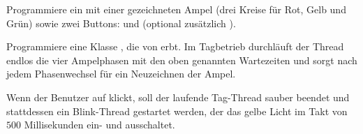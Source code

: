 \begin{compactenum}[a)]
\item Programmiere ein  mit einer gezeichneten Ampel (drei
Kreise für Rot, Gelb und Grün) sowie zwei Buttons:  und
 (optional zusätzlich ).

\item Programmiere eine Klasse , die von 
erbt. Im Tagbetrieb durchläuft der Thread endlos die vier Ampelphasen mit den
oben genannten Wartezeiten und sorgt nach jedem Phasenwechsel für ein
Neuzeichnen der Ampel.

\item Wenn der Benutzer auf  klickt, soll der laufende
Tag-Thread sauber beendet und stattdessen ein Blink-Thread gestartet werden,
der das gelbe Licht im Takt von $500$ Millisekunden ein- und ausschaltet.
\end{compactenum}

